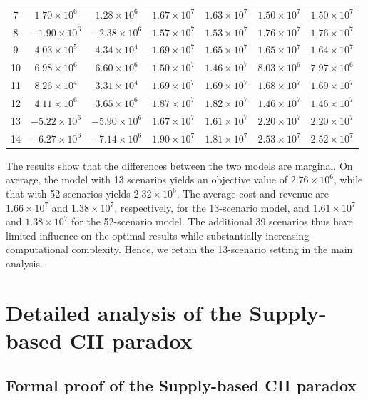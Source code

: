 \documentclass[11pt,english]{article}
\begin{document}
\begin{table}[htbp]
{\begin{tabular}{ccccccc}
7  & $1.70{\times}10^6$  & $1.28{\times}10^6$  & $1.67{\times}10^7$ & $1.63{\times}10^7$ & $1.50{\times}10^7$ & $1.50{\times}10^7$ \\
8  & $-1.90{\times}10^6$ & $-2.38{\times}10^6$ & $1.57{\times}10^7$ & $1.53{\times}10^7$ & $1.76{\times}10^7$ & $1.76{\times}10^7$ \\
9  & $4.03{\times}10^5$  & $4.34{\times}10^4$  & $1.69{\times}10^7$ & $1.65{\times}10^7$ & $1.65{\times}10^7$ & $1.64{\times}10^7$ \\
10 & $6.98{\times}10^6$  & $6.60{\times}10^6$  & $1.50{\times}10^7$ & $1.46{\times}10^7$ & $8.03{\times}10^6$ & $7.97{\times}10^6$ \\
11 & $8.26{\times}10^4$  & $3.31{\times}10^4$  & $1.69{\times}10^7$ & $1.69{\times}10^7$ & $1.68{\times}10^7$ & $1.69{\times}10^7$ \\
12 & $4.11{\times}10^6$  & $3.65{\times}10^6$  & $1.87{\times}10^7$ & $1.82{\times}10^7$ & $1.46{\times}10^7$ & $1.46{\times}10^7$ \\
13 & $-5.22{\times}10^6$ & $-5.90{\times}10^6$ & $1.67{\times}10^7$ & $1.61{\times}10^7$ & $2.20{\times}10^7$ & $2.20{\times}10^7$ \\
14 & $-6.27{\times}10^6$ & $-7.14{\times}10^6$ & $1.90{\times}10^7$ & $1.81{\times}10^7$ & $2.53{\times}10^7$ & $2.52{\times}10^7$ \\
\bottomrule
\end{tabular}}
\end{table}

The results show that the differences between the two models are marginal. On average, the model with 13 scenarios yields an objective value of $2.76\times10^6$, while that with 52 scenarios yields $2.32\times10^6$. The average cost and revenue are $1.66\times10^7$ and $1.38\times10^7$, respectively, for the 13-scenario model, and $1.61\times10^7$ and $1.38\times10^7$ for the 52-scenario model. The additional 39 scenarios thus have limited influence on the optimal results while substantially increasing computational complexity. Hence, we retain the 13-scenario setting in the main analysis.

\section{Detailed analysis of the Supply-based CII paradox}
\label{appendix:supply_cii}

\subsection{Formal proof of the Supply-based CII paradox}
\label{appendix:supply_cii_theory}
\end{document}
